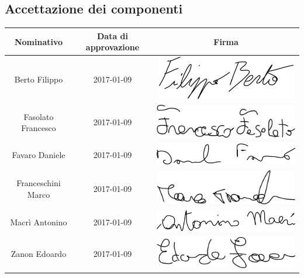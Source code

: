 \documentclass[../PianoDiProgetto_v4.0.0.tex]{subfiles}
\begin{document}
\vfill	
\newpage
\vfill

	\subsection{Accettazione dei componenti}
	
		\begin{table}[h]
	
		\begin{tabularx}{\textwidth}{C C C}
			\toprule
			\textbf{Nominativo} & \textbf{Data di approvazione} & \textbf{Firma} \\
			\midrule
			Berto Filippo & 2017-01-09 & \includegraphics[scale=0.4]{Firme/fberto_firma} \\[1.2ex]
			Fasolato Francesco & 2017-01-09 & \includegraphics[scale=0.3]{Firme/ffasolato_firma} \\[1.2ex]
			Favaro Daniele & 2017-01-09 & \includegraphics[scale=0.3]{Firme/dfavaro_firma} \\[1.2ex]
			Franceschini Marco & 2017-01-09 &	\includegraphics[scale=0.4]{Firme/mfrances_firma} \\[1.2ex]
			Macrì Antonino & 2017-01-09 & \includegraphics[scale=0.3]{Firme/amacri_firma} \\[1.2ex]
			Zanon Edoardo & 2017-01-09 & \includegraphics[scale=0.3]{Firme/ezanon_firma} \\[1.2ex]

\end{tabularx}
\end{table}
\end{document}
